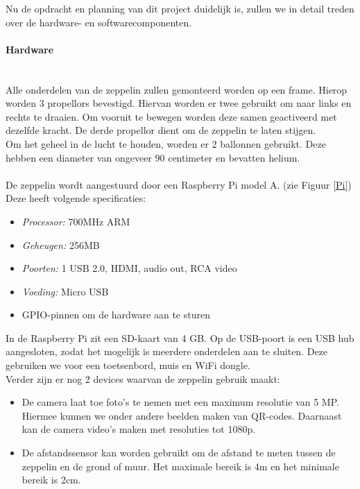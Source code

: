 \documentclass{peno-opdracht2}
\begin{document}
\maketitle

Nu de opdracht en planning van dit project duidelijk is, zullen we in detail treden over de hardware- en softwarecomponenten. 
\paragraph{Hardware} ~\\
Alle onderdelen van de zeppelin zullen gemonteerd worden op een frame. Hierop worden 3 propellors bevestigd. Hiervan worden er twee gebruikt om naar links en rechts te draaien. Om vooruit te bewegen worden deze samen geactiveerd met dezelfde kracht. De derde propellor dient om de zeppelin te laten stijgen. ~\\

Om het geheel in de lucht te houden, worden er 2 ballonnen gebruikt. Deze hebben een diameter van ongeveer 90 centimeter en bevatten helium. \\
\\
De zeppelin wordt aangestuurd door een Raspberry Pi model A. (zie Figuur \ref{Pi}) Deze heeft volgende specificaties: 
\begin{itemize}
	\item \emph{Processor:} 700MHz ARM
	\item \emph{Geheugen:} 256MB 
	\item \emph{Poorten:} 1 USB 2.0, HDMI, audio out, RCA video
	\item \emph{Voeding:} Micro USB
	\item GPIO-pinnen om de hardware aan te sturen
\end{itemize}

In de Raspberry Pi zit een SD-kaart van 4 GB. Op de USB-poort is een USB hub aangesloten, zodat het mogelijk is meerdere onderdelen aan te sluiten. Deze gebruiken we voor een toetsenbord, muis en WiFi dongle. \\

Verder zijn er nog 2 devices waarvan de zeppelin gebruik maakt:
\begin{itemize}
	\item De camera laat toe foto's te nemen met een maximum resolutie van 5 MP. Hiermee kunnen we onder andere beelden maken van QR-codes. Daarnaast kan de camera video's maken met resoluties tot 1080p. 
	\item De afstandssensor kan worden gebruikt om de afstand te meten tussen de zeppelin en de grond of muur. Het maximale bereik is 4m en het minimale bereik is 2cm.\\
\end{itemize}
\end{document}
